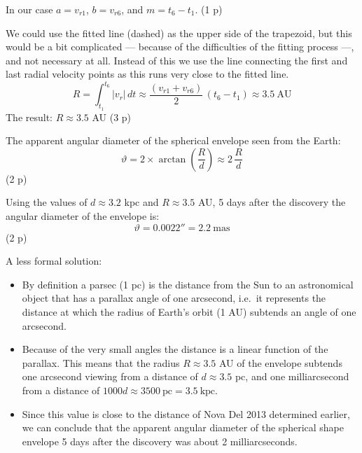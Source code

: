 \begin{description}
  In our case $a = v_{r1}$, $b = v_{r6}$, and $m = t_6 - t_1$. \hfill(1 p)

  We could use the fitted line (dashed) as the upper side of the trapezoid,
  but this would be a bit complicated --- because of the difficulties of the
  fitting process ---, and not necessary at all. Instead of this we use the
  line connecting the first and last radial velocity points as this runs very
  close to the fitted line.
  \[ R = \int_{t_1}^{t_6} |v_r|\,dt
     \approx \frac{(v_{r1} + v_{r6})}{2}\,(t_6 - t_1)
     \approx 3.5\ \mathrm{AU} \]
  The result: $R \approx 3.5$ AU \hfill(3 p)

\item[i)] The apparent angular diameter of the spherical envelope seen from
  the Earth:
  \[ \vartheta = 2 \times \arctan\left( \frac{R}{d} \right)
     \approx 2\,\frac{R}{d}
     \tag*{(1.15)} \]
  \hfill(2 p)

  Using the values of $d \approx 3.2$ kpc and $R \approx 3.5$ AU, 5 days
  after the discovery the angular diameter of the envelope is:
  \[ \vartheta = 0.0022'' = 2.2\ \mathrm{mas} \]
  \hfill(2 p)

  A less formal solution:
  \begin{itemize}
  \item By definition a parsec (1 pc) is the distance from the Sun to an
    astronomical object that has a parallax angle of one arcsecond, i.e.\ it
    represents the distance at which the radius of Earth's orbit (1 AU)
    subtends an angle of one arcsecond.
  \item Because of the very small angles the distance is a linear function of
    the parallax. This means that the radius $R \approx 3.5$ AU of the
    envelope subtends one arcsecond viewing from a distance of
    $d \approx 3.5$ pc, and one milliarcsecond from a distance of
    $1000d \approx 3500\ \mathrm{pc} = 3.5\ \mathrm{kpc}$.
  \item Since this value is close to the distance of Nova Del 2013 determined
    earlier, we can conclude that the apparent angular diameter of the
    spherical shape envelope 5 days after the discovery was about 2
    milliarcseconds.
  \end{itemize}

\end{description}


